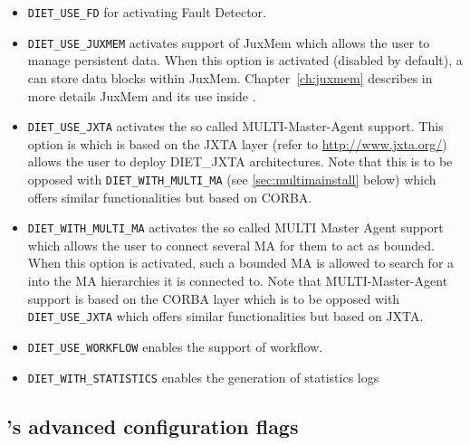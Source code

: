 \begin{itemize}
\item
  \verb+DIET_USE_FD+ for activating Fault Detector.

\item 
  \verb+DIET_USE_JUXMEM+ activates \diet support of JuxMem which allows the
  user to manage persistent data. When this option is activated (disabled by
  default), a \sed can store data blocks within JuxMem. Chapter~\ref{ch:juxmem}
  describes in more details JuxMem and its use inside \diet.

\item
  \verb+DIET_USE_JXTA+ activates the so called MULTI-Master-Agent
  support. This option is which is based on the JXTA layer (refer to
  \url{http://www.jxta.org/}) allows the user to deploy DIET\_JXTA
  architectures. Note that this is to be opposed with
  \verb+DIET_WITH_MULTI_MA+ (see \ref{sec:multimainstall} below) which
  offers similar functionalities but based on CORBA.

\item
  \label{sec:multimainstall}
  \verb+DIET_WITH_MULTI_MA+ activates the so called MULTI Master Agent
  support which allows the user to connect several MA for them to act
  as bounded.
  When this option is activated, such a bounded MA is allowed to search
  for a \sed into the MA hierarchies it is connected to.
  Note that MULTI-Master-Agent support is based on the CORBA layer
  which is to be opposed with \verb+DIET_USE_JXTA+ which offers similar
  functionalities but based on JXTA.

\item
  \verb+DIET_USE_WORKFLOW+ enables the support of workflow.

\item
  \verb+DIET_WITH_STATISTICS+ enables the generation of statistics logs
\end{itemize}

\subsection{\diet's advanced configuration flags}
\noindent

